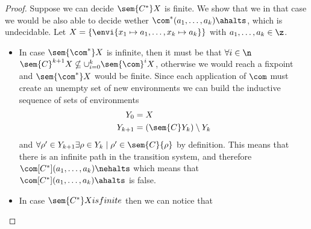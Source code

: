 \begin{proof}
  Suppose we can decide \(\sem{C^*}X\) is finite. We show that we in
  that case we would be also able to decide wether \(\com^*(a_1,
  \dots, a_k)\ahalts\), which is undecidable. Let \(X = \{\envi{x_1
    \mapsto a_1, \dots, x_k \mapsto a_k}\}\) with \(a_1, \dots, a_k
  \in \z\).
  \begin{itemize}
  \item In case \(\sem{\com^*}X\) is infinite, then it must be that
    \(\forall i \in \n\) \(\sem{C}^{k+1}X \nsubseteq
    \cup_{i=0}^k\sem{\com}^iX\), otherwise we would reach a fixpoint
    and \(\sem{\com^*}X\) would be finite. Since each application of
    \(\com\) must create an unempty set of new environments we can
    build the inductive sequence of sets of environments
    \begin{align*}
      Y_0 & = X \\
      Y_{k+1} & = (\sem{C}Y_k)\setminus Y_k
    \end{align*}
    and \(\forall \rho' \in Y_{k+1} \exists \rho \in Y_k \mid \rho'
    \in \sem{C}\{\rho\}\) by definition. This means that there is an
    infinite path in the transition system, and therefore
    \(\com[C^*](a_1, \dots, a_k) \nehalts\) which means that
    \(\com[C^*] (a_1, \dots, a_k)\ahalts\) is false.
  \item In case \(\sem{C^*}X is finite\) then we can notice that
  \end{itemize}
\end{proof}
